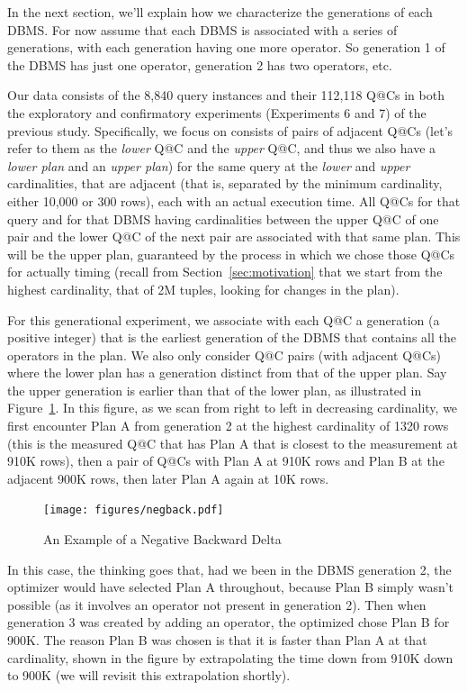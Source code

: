 \documentclass[prodmode,acmtods]{acmsmall}
\begin{document}
In the next section, we'll explain how we characterize the generations of
each DBMS. For now assume that each DBMS is associated with a series of
generations, with each generation having one more operator. So generation 1
of the DBMS has just one operator, generation 2 has two operators, etc.

Our data consists of the 8,840 query instances and their 112,118 Q@Cs in
both the exploratory and confirmatory experiments (Experiments 6 and 7) of
the previous study. Specifically, we focus on consists of pairs of adjacent
Q@Cs (let's refer to them as the {\em lower} Q@C and the {\em upper} Q@C,
and thus we also have a {\em lower plan} and an {\em upper plan}) for the
same query at the {\em lower} and {\em upper} cardinalities, that are
adjacent (that is, separated by the minimum cardinality, either 10,000 or
300 rows), each with an actual execution time. All Q@Cs for that query and
for that DBMS having cardinalities between the upper Q@C of one pair and the
lower Q@C of the next pair are associated with that same plan. This will be
the upper plan, guaranteed by the process in which we chose those Q@Cs for
actually timing (recall from Section~\ref{sec:motivation} that we start from
the highest cardinality, that of 2M tuples, looking for changes in the
plan).

For this generational experiment, we associate with each Q@C a generation
(a positive integer) that
is the earliest generation of the DBMS that contains all the operators in the
plan. We also only consider Q@C pairs (with adjacent Q@Cs) where the lower
plan has a generation distinct from that of the upper plan.  Say the upper
generation is earlier than that of the lower plan, as illustrated in
Figure~\ref{fig:negback}. In this figure, as we scan from right to left in
decreasing cardinality, we first encounter Plan A from generation 2 at the
highest cardinality of 1320 rows (this is the
measured Q@C that has Plan A that is closest to the measurement at 910K rows), then a pair of Q@Cs with Plan A at 910K rows and Plan B at the
adjacent 900K rows, then later Plan A again at 10K rows.

\begin{figure}[t]
\texttt{[image: figures/negback.pdf]}
\caption{An Example of a Negative Backward Delta\label{fig:negback}}
\end{figure}

In this case, the thinking goes that, had we been
in the \hbox{DBMS} generation 2, the optimizer would have selected Plan A
throughout, because Plan B simply wasn't possible (as it involves an
operator not present in generation 2). Then when generation 3 was created by
adding an operator, the optimized chose Plan B for 900K. The reason Plan B
was chosen is that it is faster than Plan A at that cardinality, shown in
the figure by extrapolating the time down from 910K down to 900K (we will
revisit this extrapolation shortly).
\end{document}
